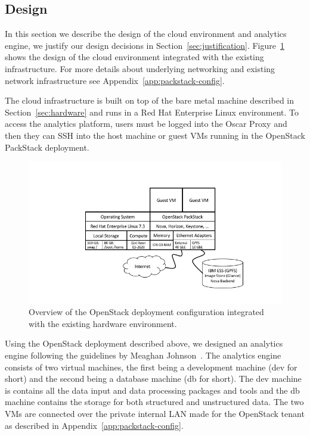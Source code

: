 \subsection{Design}
\label{sec:design}

In this section we describe the design of the cloud environment and
analytics engine, we justify our design decisions in
Section~\ref{sec:justification}. Figure~\ref{fig:design-cloud} shows
the design of the cloud environment integrated with the existing
infrastructure. For more details about underlying networking and
existing network infrastructure see Appendix~\ref{app:packstack-config}.

The cloud infrastructure is built on top of the bare metal machine
described in Section~\ref{sec:hardware} and runs in a Red Hat Enterprise
Linux environment. To access the analytics platform, users must be logged into
the Oscar Proxy and then they can SSH into the host machine or guest VMs
running in the OpenStack PackStack deployment.

\begin{figure}[H]
  \centering
  \includegraphics[scale=0.60]{img/design-cloud}
  \caption{Overview of the OpenStack deployment configuration integrated with
  the existing hardware environment.}
  \label{fig:design-cloud}
\end{figure}

Using the OpenStack deployment described above, we designed an analytics
engine following the guidelines by Meaghan Johnson~\cite{alchemy}. The
analytics engine consists of two virtual machines, the first being a
development machine (dev for short) and the second being a database
machine (db for short). The dev machine is contains all the data input
and data processing packages and tools and the db machine contains the
storage for both structured and unstructured data. The two VMs are
connected over the private internal LAN made for the OpenStack tenant as
described in Appendix~\ref{app:packstack-config}. 

